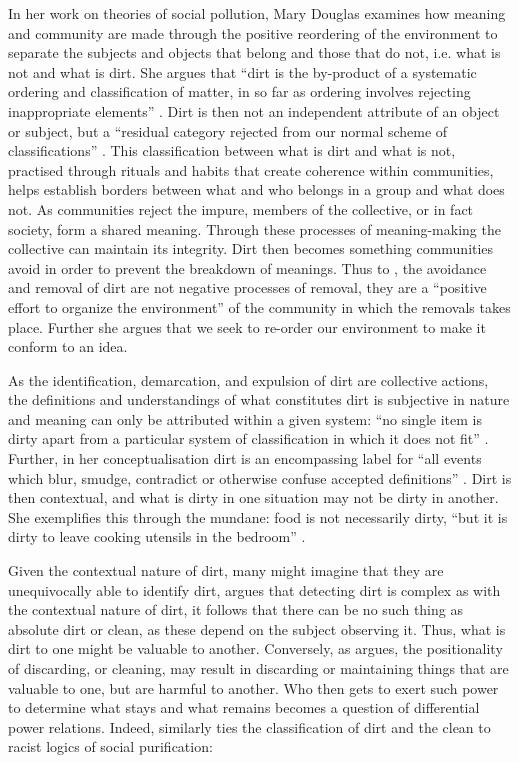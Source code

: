 In her work on theories of social pollution, Mary Douglas \citeyearpar{Douglas:1966} examines how meaning and community are made through the positive reordering of the environment to separate the subjects and objects that belong and those that do not, i.e.
what is not and what is dirt.
She argues that ``dirt is the by-product of a systematic ordering and classification of matter, in so far as ordering involves rejecting inappropriate elements'' \citep{Douglas:1966}.
Dirt is then not an independent attribute of an object or subject, but a ``residual category rejected from our normal scheme of classifications'' \citep{Douglas:1966}.
This classification between what is dirt and what is not, practised through rituals and habits that create coherence within communities, helps establish borders between what and who belongs in a group and what does not.
As communities reject the impure, members of the collective, or in fact society, form a shared meaning.
Through these processes of meaning-making the collective can maintain its integrity.
Dirt then becomes something communities avoid in order to prevent the breakdown of meanings.
Thus to \citet{Douglas:1966}, the avoidance and removal of dirt are not negative processes of removal, they are a ``positive effort to organize the environment'' \citep{Douglas:1966} of the community in which the removals takes place.
Further she argues that we seek to re-order our environment to make it conform to an idea.

As the identification, demarcation, and expulsion of dirt are collective actions, the definitions and understandings of what constitutes dirt is subjective in nature and meaning can only be attributed within a given system: ``no single item is dirty apart from a particular system of classification in which it does not fit'' \citep{Douglas:1966}.
Further, in her conceptualisation dirt is an encompassing label for ``all events which blur, smudge, contradict or otherwise confuse accepted definitions'' \citep{Douglas:1966}.
Dirt is then contextual, and what is dirty in one situation may not be dirty in another.
She exemplifies this through the mundane: food is not necessarily dirty, ``but it is dirty to leave cooking utensils in the bedroom'' \citep{Douglas:1966}.

Given the contextual nature of dirt, many might imagine that they are unequivocally able to identify dirt, \citet{Douglas:1966} argues that detecting dirt is complex as with the contextual nature of dirt, it follows that there can be no such thing as absolute dirt or clean, as these depend on the subject observing it.
Thus, what is dirt to one might be valuable to another.
Conversely, as \citet{Lepawsky:2019} argues, the positionality of discarding, or cleaning, may result in discarding or maintaining things that are valuable to one, but are harmful to another.
Who then gets to exert such power to determine what stays and what remains becomes a question of differential power relations.
Indeed, \citet{Hall:1997} similarly ties the classification of dirt and the clean to racist logics of social purification:

